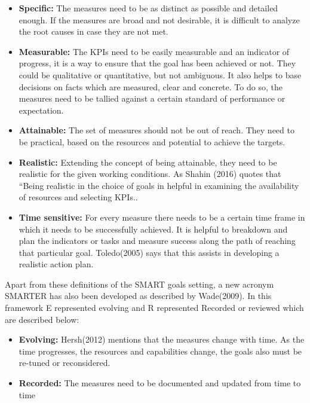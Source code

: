 \begin{itemize}
    \item \textbf{Specific:}
    The measures need to be as distinct as possible and detailed enough. If the measures are broad and not desirable, it is difficult to analyze the root causes in case they are not met. \\

    \item \textbf{Measurable:}
    The KPIs need to be easily measurable and an indicator of progress, it is a way to ensure that the goal has been achieved or not. They could be qualitative or quantitative, but not ambiguous. It also helps to base decisions on facts which are measured, clear and concrete. To do so, the measures need to be tallied against a certain standard of performance or expectation.\\

    \item \textbf{Attainable:} The set of measures should not be out of reach. They need to be practical, based on the resources and potential to achieve the targets.  \\
  
    \item \textbf{Realistic:}
    Extending the concept of being attainable, they need to be realistic for the given working conditions. As Shahin (2016) quotes that “Being realistic in the choice of goals in helpful in examining the availability of resources and selecting KPIs..\\

    \item \textbf{Time sensitive:} For every measure there needs to be a certain time frame in which it needs to be successfully achieved. It is helpful to breakdown and plan the indicators or tasks and measure success along the path of reaching that particular goal. Toledo(2005) says that this assists in developing a realistic action plan.  \\

\end{itemize}

Apart from these definitions of the SMART goals setting, a new acronym SMARTER has also been developed as described by Wade(2009). In this framework E represented evolving and R represented Recorded or reviewed which are described below:\\

\begin{itemize}
    \item \textbf{Evolving:}
    Hersh(2012) mentions that the measures change with time. As the time progresses, the resources and capabilities change, the goals also must be re-tuned or reconsidered.\\   

    \item \textbf{Recorded:}
    The measures need to be documented and updated from time to time\\
\end{itemize}

